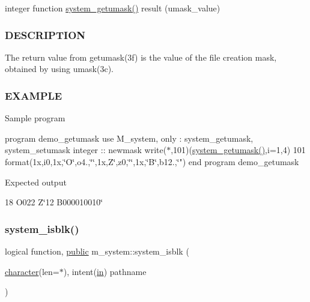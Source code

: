 integer function \hyperlink{namespacem__system_aa9ca951be39d2ea738d627cf42c00ddd}{system\+\_\+getumask()} result (umask\+\_\+value) \subsubsection*{D\+E\+S\+C\+R\+I\+P\+T\+I\+ON}

The return value from getumask(3f) is the value of the file creation mask, obtained by using umask(3c). \subsubsection*{E\+X\+A\+M\+P\+LE}

Sample program

program demo\+\_\+getumask use M\+\_\+system, only \+: system\+\_\+getumask, system\+\_\+setumask integer \+:\+: newmask write($\ast$,101)(\hyperlink{namespacem__system_aa9ca951be39d2ea738d627cf42c00ddd}{system\+\_\+getumask()},i=1,4) 101 format(1x,i0,1x,\char`\"{}\+O\textquotesingle{}\char`\"{},o4.,\char`\"{}\textquotesingle{}\char`\"{},1x,\textquotesingle{}Z\char`\"{}\textquotesingle{},z0,\char`\"{}\textquotesingle{}\char`\"{},1x,\char`\"{}B\textquotesingle{}\char`\"{},b12.,\char`\"{}\textquotesingle{}") end program demo\+\_\+getumask

Expected output

18 O\textquotesingle{}022\textquotesingle{} Z\char`\"{}12\textquotesingle{} B\textquotesingle{}000010010\char`\"{} \mbox{\label{namespacem__system_a791fa587005ec07cbcd7b0045ee6f43f}} 
\subsubsection{\texorpdfstring{system\+\_\+isblk()}{system\_isblk()}}
{\footnotesize\ttfamily logical function, \hyperlink{M__stopwatch_83_8txt_a2f74811300c361e53b430611a7d1769f}{public} m\+\_\+system\+::system\+\_\+isblk (\begin{DoxyParamCaption}\item[{\hyperlink{option__stopwatch_83_8txt_abd4b21fbbd175834027b5224bfe97e66}{character}(len=$\ast$), intent(\hyperlink{M__journal_83_8txt_afce72651d1eed785a2132bee863b2f38}{in})}]{pathname }\end{DoxyParamCaption})}



